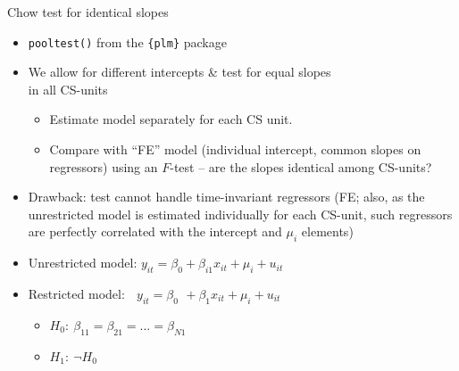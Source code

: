 \documentclass{beamer}
\begin{document}
\begin{frame}{Chow test for identical slopes}
\begin{itemize}
    \item \texttt{pooltest()} from the \texttt{\{plm\}} package 
    \smallskip
    \item We allow for different intercepts \& test for equal slopes \\in all CS-units
    \begin{itemize}
        \item Estimate model separately for each CS unit.
        \item Compare with ``FE'' model (individual intercept, common slopes on regressors) using an $F$-test -- are the slopes identical among CS-units?
    \end{itemize}
    \smallskip
    \item Drawback: test cannot handle time-invariant regressors (FE; also, as the unrestricted model is estimated individually for each CS-unit, such regressors are perfectly correlated with the intercept and $\mu_i$ elements)
    \medskip
    \item Unrestricted model: $y_{it} = \beta_{0} + \beta_{i1} x_{it} + \mu_i + u_{it}$
    \smallskip
    \item Restricted model: $\,~~y_{it} = \beta_{0}~ \, + \beta_1 x_{it} + \mu_i + u_{it}$
\begin{itemize}
    \item[] $H_0:~\beta_{11}=\beta_{21}=\dots=\beta_{N1}$  
    \item[] $H_1:~\neg H_0$
\end{itemize}
\end{itemize}
\end{frame}
\end{document}
